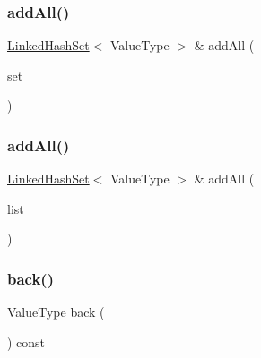 \mbox{\label{classLinkedHashSet_aea58f348e4d2647373accd2a46b962ea}} 
\subsubsection{\texorpdfstring{add\+All()}{addAll()}\hspace{0.1cm}{\footnotesize\ttfamily [1/2]}}
{\footnotesize\ttfamily \mbox{\hyperlink{classLinkedHashSet}{Linked\+Hash\+Set}}$<$ Value\+Type $>$ \& add\+All (\begin{DoxyParamCaption}\item[{const \mbox{\hyperlink{classLinkedHashSet}{Linked\+Hash\+Set}}$<$ Value\+Type $>$ \&}]{set }\end{DoxyParamCaption})}

\mbox{\label{classLinkedHashSet_ab1f3d84428461b3c267afb15c4568c93}} 
\subsubsection{\texorpdfstring{add\+All()}{addAll()}\hspace{0.1cm}{\footnotesize\ttfamily [2/2]}}
{\footnotesize\ttfamily \mbox{\hyperlink{classLinkedHashSet}{Linked\+Hash\+Set}}$<$ Value\+Type $>$ \& add\+All (\begin{DoxyParamCaption}\item[{std\+::initializer\+\_\+list$<$ Value\+Type $>$}]{list }\end{DoxyParamCaption})}

\mbox{\label{classLinkedHashSet_a38cbd80c93f450dc9bf3ca7c6a6220bd}} 
\subsubsection{\texorpdfstring{back()}{back()}}
{\footnotesize\ttfamily Value\+Type back (\begin{DoxyParamCaption}{ }\end{DoxyParamCaption}) const}

